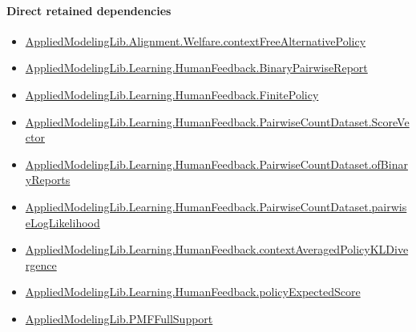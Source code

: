 \documentclass[10pt]{article}
\begin{document}
\paragraph{Direct retained dependencies}
\begin{itemize}\raggedright
\item \hyperlink{governing-declaration-b7cf9e04e23161e5}{Applied\allowbreak{}Modeling\allowbreak{}Lib.\allowbreak{}Alignment.\allowbreak{}Welfare.\allowbreak{}context\allowbreak{}Free\allowbreak{}Alternative\allowbreak{}Policy}
\item \hyperlink{governing-declaration-bc3d6ca8e7e0ac9d}{Applied\allowbreak{}Modeling\allowbreak{}Lib.\allowbreak{}Learning.\allowbreak{}Human\allowbreak{}Feedback.\allowbreak{}Binary\allowbreak{}Pairwise\allowbreak{}Report}
\item \hyperlink{governing-declaration-577316c60f45ef11}{Applied\allowbreak{}Modeling\allowbreak{}Lib.\allowbreak{}Learning.\allowbreak{}Human\allowbreak{}Feedback.\allowbreak{}Finite\allowbreak{}Policy}
\item \hyperlink{governing-declaration-87eda978eb1b0c9d}{Applied\allowbreak{}Modeling\allowbreak{}Lib.\allowbreak{}Learning.\allowbreak{}Human\allowbreak{}Feedback.\allowbreak{}Pairwise\allowbreak{}Count\allowbreak{}Dataset.\allowbreak{}Score\allowbreak{}Vector}
\item \hyperlink{governing-declaration-449f87e91bf37ce0}{Applied\allowbreak{}Modeling\allowbreak{}Lib.\allowbreak{}Learning.\allowbreak{}Human\allowbreak{}Feedback.\allowbreak{}Pairwise\allowbreak{}Count\allowbreak{}Dataset.\allowbreak{}of\allowbreak{}Binary\allowbreak{}Reports}
\item \hyperlink{governing-declaration-10adb9e7c1ff9f4c}{Applied\allowbreak{}Modeling\allowbreak{}Lib.\allowbreak{}Learning.\allowbreak{}Human\allowbreak{}Feedback.\allowbreak{}Pairwise\allowbreak{}Count\allowbreak{}Dataset.\allowbreak{}pairwise\allowbreak{}Log\allowbreak{}Likelihood}
\item \hyperlink{governing-declaration-c528a6568d75fffd}{Applied\allowbreak{}Modeling\allowbreak{}Lib.\allowbreak{}Learning.\allowbreak{}Human\allowbreak{}Feedback.\allowbreak{}context\allowbreak{}Averaged\allowbreak{}Policy\allowbreak{}KL\allowbreak{}Divergence}
\item \hyperlink{governing-declaration-4daa53fb741a5ea7}{Applied\allowbreak{}Modeling\allowbreak{}Lib.\allowbreak{}Learning.\allowbreak{}Human\allowbreak{}Feedback.\allowbreak{}policy\allowbreak{}Expected\allowbreak{}Score}
\item \hyperlink{library-prerequisite-268c959ee7d2d148}{Applied\allowbreak{}Modeling\allowbreak{}Lib.\allowbreak{}PMF\allowbreak{}Full\allowbreak{}Support}
\end{itemize}
\end{document}
